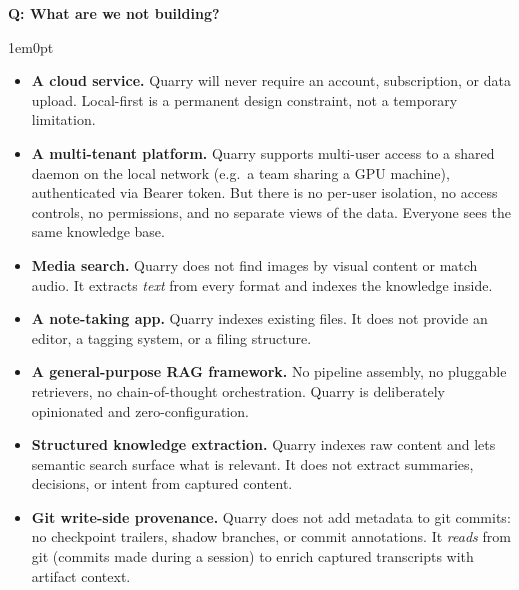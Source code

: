 \documentclass[11pt,letterpaper]{article}
\newcounter{faqnum}
\newenvironment{faqpair}[1]{%
  \needspace{4\baselineskip}%
  \vspace{0.5em}%
  \refstepcounter{faqnum}%
  \noindent\textbf{\color{SectionBlue}Q\thefaqnum: #1}\par\nopagebreak[4]%
  \vspace{0.2em}%
  \begin{adjustwidth}{1em}{0pt}%
  \setlength{\parindent}{0pt}%
}{%
  \end{adjustwidth}%
  \vspace{0.5em}%
}
\begin{document}
\begin{faqpair}{What are we not building?}\label{faq:not-building}
  \begin{itemize}[leftmargin=1.5em, nosep]
    \item \textbf{A cloud service.} Quarry will never require an account,
          subscription, or data upload. Local-first is a permanent design
          constraint, not a temporary limitation.
    \item \textbf{A multi-tenant platform.} Quarry supports multi-user access
          to a shared daemon on the local network (e.g.\ a team sharing a
          GPU machine), authenticated via Bearer token. But there is no
          per-user isolation, no access controls, no permissions, and no
          separate views of the data. Everyone sees the same knowledge base.
    \item \textbf{Media search.} Quarry does not find images by visual content
          or match audio. It extracts \emph{text} from every format and indexes
          the knowledge inside.
    \item \textbf{A note-taking app.} Quarry indexes existing files. It does not
          provide an editor, a tagging system, or a filing structure.
    \item \textbf{A general-purpose RAG framework.} No pipeline assembly, no
          pluggable retrievers, no chain-of-thought orchestration. Quarry is
          deliberately opinionated and zero-configuration.
    \item \textbf{Structured knowledge extraction.} Quarry indexes raw content
          and lets semantic search surface what is relevant. It does not extract
          summaries, decisions, or intent from captured content.
    \item \textbf{Git write-side provenance.} Quarry does not add metadata to
          git commits: no checkpoint trailers, shadow branches, or commit
          annotations. It \emph{reads} from git (commits made during a session)
          to enrich captured transcripts with artifact context.
  \end{itemize}
\end{faqpair}
\end{document}

